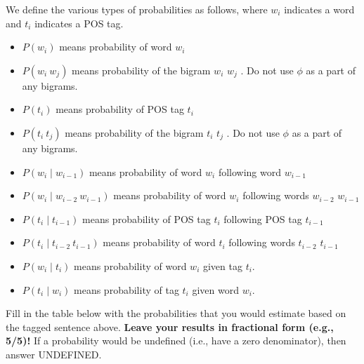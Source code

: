 \documentclass[11pt]{article}
\begin{document}
\begin{enumerate}
We define the various types of probabilities as follows, where $w_i$
indicates a word and $t_i$ indicates a POS tag. 

\begin{itemize}
\item $P(w_i)$ means probability of word $w_i$
\item $P(w_i~w_j)$ means probability of the bigram $w_i$ $w_j$ . Do
  not use $\phi$  as a part of any bigrams. 
\item $P(t_i)$ means probability of POS tag $t_i$
\item $P(t_i~t_j)$ means probability of the bigram $t_i$ $t_j$ . Do
  not use $\phi$ as a part of any bigrams. 
\item $P(w_i \mid w_{i-1})$ means probability of word   $w_i$   following word $w_{i-1}$
\item$P(w_i \mid w_{i-2}~w_{i-1})$ means probability of word $w_i$  following words $w_{i-2}$ $w_{i-1}$ 
\item$P(t_i \mid t_{i-1})$ means probability of POS  tag $t_i$ following POS tag $t_{i-1}$
\item$P(t_i \mid t_{i-2}~t_{i-1})$ means probability of word $t_i$ following words $t_{i-2}$ $t_{i-1}$
\item$P(w_i \mid t_i)$ means  probability of word $w_i$ given tag $t_i$.
\item$P(t_i \mid w_i)$ means  probability of tag $t_i$ given word $w_i$.
\end{itemize}

Fill in the table below with the probabilities that you would estimate
based on the tagged sentence above. {\bf Leave your results in fractional
  form (e.g., 5/5)!}  If a probability would be undefined (i.e.,
have a zero denominator), then answer UNDEFINED. 


\end{enumerate}
\end{document}

